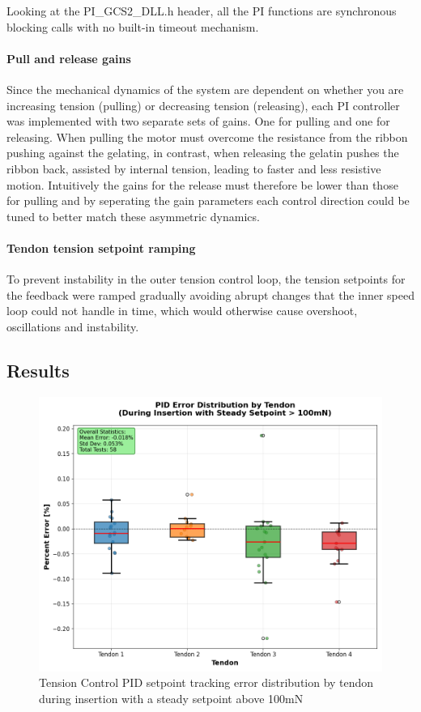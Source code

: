 Looking at the PI_GCS2_DLL.h header, all the PI functions are synchronous blocking calls with no built-in timeout mechanism.

\paragraph*{Pull and release gains}
Since the mechanical dynamics of the system are dependent on whether you are increasing tension (pulling) or decreasing tension (releasing), each PI controller was implemented with two separate sets of gains. One for pulling and one for releasing. When pulling the motor must overcome the resistance from the ribbon pushing against the gelating, in contrast, when releasing the gelatin pushes the ribbon back, assisted by internal tension, leading to faster and less resistive motion. Intuitively the gains for the release must therefore be lower than those for pulling and by seperating the gain parameters each control direction could be tuned to better match these asymmetric dynamics.

\paragraph*{Tendon tension setpoint ramping}
To prevent instability in the outer tension control loop, the tension setpoints for the feedback were ramped gradually avoiding abrupt changes that the inner speed loop could not handle in time, which would otherwise cause overshoot, oscillations and instability.

\subsection{Results}

\begin{figure} [H]
    \centering
    \includegraphics[width=0.9\linewidth]{images/PID performance/PIDErrorDistByTendon.png}
    \caption{Tension Control PID setpoint tracking error distribution by tendon during insertion with a steady setpoint above 100mN}
    \label{fig:PIDErrorDistByTendon}
\end{figure}

